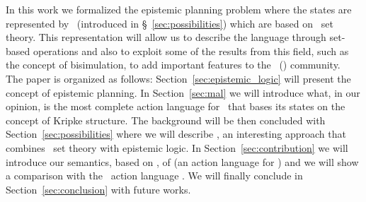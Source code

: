 	In this work we formalized the epistemic planning problem where the states are represented by \emph{\posS}\ (introduced in \S~\ref{sec:possibilities}) which are based on \nwf\ set theory.
	This representation will allow us to describe the language through set-based operations and also to exploit some of the results from this field, such as the concept of bisimulation, to add important features to the \mAGep\ (\mep) community.\\

	The paper is organized as follows: Section~\ref{sec:epistemic_logic} will present the concept of epistemic planning. %
	In Section~\ref{sec:mal} we will introduce what, in our opinion, is the most complete action language for \mep\ that bases its states on the concept of Kripke structure.
	The background will be then concluded with Section~\ref{sec:possibilities} where we will describe \posS, an interesting approach that combines \nwf\ set theory with epistemic logic.
	In Section~\ref{sec:contribution} we will introduce our semantics, based on \posS, of \ourL (an action language for \mep) and we will show a comparison with the \sota\ action language \mAL.
	We will finally conclude in Section~\ref{sec:conclusion} with future works.
